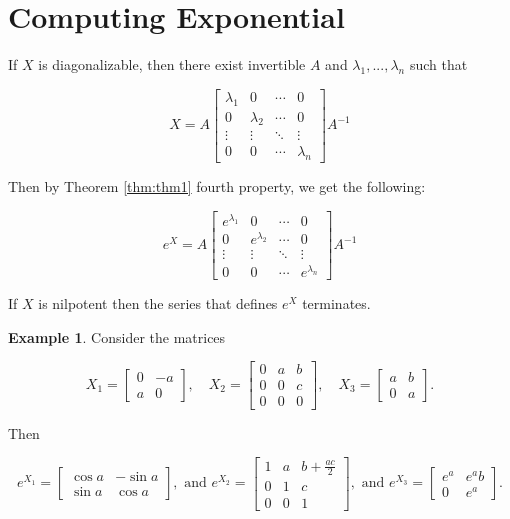 \documentclass[
]{book}
\theoremstyle{definition}
\theoremstyle{definition}
\newtheorem{example}{Example}[chapter]
\theoremstyle{definition}
\theoremstyle{definition}
\theoremstyle{remark}
\begin{document}
\section{Computing Exponential}\label{computing-exponential}

If \(X\) is diagonalizable, then there exist invertible \(A\) and \(\lambda_1,...,\lambda_n\) such that

\[X = A
\begin{bmatrix}
{\lambda_1} & 0 & \cdots & 0 \\
0 & {\lambda_2} & \cdots & 0 \\
\vdots & \vdots & \ddots & \vdots \\
0 & 0 & \cdots & {\lambda_n}
\end{bmatrix}
A^{-1}\]

Then by Theorem \ref{thm:thm1} fourth property, we get the following:

\[e^X = A
\begin{bmatrix}
e^{\lambda_1} & 0 & \cdots & 0 \\
0 & e^{\lambda_2} & \cdots & 0 \\
\vdots & \vdots & \ddots & \vdots \\
0 & 0 & \cdots & e^{\lambda_n}
\end{bmatrix}A^{-1}\]

If \(X\) is nilpotent then the series that defines \(e^X\) terminates.

\begin{example}
\protect\hypertarget{exm:unnamed-chunk-17}{}\label{exm:unnamed-chunk-17}Consider the matrices

\[X_1 =
\begin{bmatrix}
0 & -a \\
a & 0
\end{bmatrix}, \quad
X_2 =
\begin{bmatrix}
0 & a & b \\
0 & 0 & c \\
0 & 0 & 0
\end{bmatrix}, \quad
X_3 =
\begin{bmatrix}
a & b \\
0 & a
\end{bmatrix}.\]

Then

\[e^{X_1} =
\begin{bmatrix}
\cos a & -\sin a \\
\sin a & \cos a
\end{bmatrix}, \text{ and }
e^{X_2} =
\begin{bmatrix}
1 & a & b + \tfrac{ac}{2} \\
0 & 1 & c \\
0 & 0 & 1
\end{bmatrix}, \text{ and } 
e^{X_3} =
\begin{bmatrix}
e^a & e^a b \\
0 & e^a
\end{bmatrix}.\]
\end{example}
\end{document}
